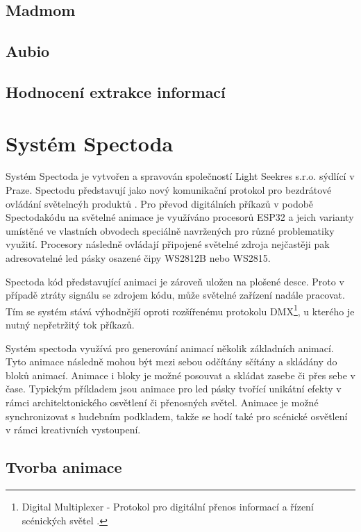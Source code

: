     
\subsection{Madmom}
\subsection{Aubio}
\subsection{Hodnocení extrakce informací} \label{sec:Mir_eval}

\section{Systém Spectoda} \label{sec:Spectoda}

Systém Spectoda je vytvořen a spravován společností Light Seekres s.r.o. sýdlící v Praze. Spectodu představují jako nový komunikační protokol pro bezdrátové ovládání světelncýh produktů \cite{Spectoda}. Pro převod digitálních příkazů v podobě Spectodakódu na světelné animace je využíváno procesorů ESP32 a jeich varianty umístěné ve vlastních obvodech speciálně navržených pro různé problematiky využití. Procesory následně ovládají připojené světelné zdroja nejčastěji pak adresovatelné led pásky osazené čipy WS2812B nebo WS2815.

Spectoda kód představující animaci je zároveň uložen na plošené desce. Proto v případě ztráty signálu se zdrojem kódu, může světelné zařízení nadále pracovat. Tím se systém stává výhodnější oproti rozšířenému protokolu DMX\footnote{Digital Multiplexer - Protokol pro digitální přenos informací a řízení scénických světel \cite{DMX}.}, u kterého je nutný nepřetržitý tok příkazů. 

Systém spectoda využívá pro generování animací několik základních animací. Tyto animace následně mohou být mezi sebou odčítány sčítány a skládány do bloků animací. Animace i bloky je možné posouvat a skládat zasebe či přes sebe v čase. Typickým příkladem jsou animace pro led pásky tvořící unikátní efekty v rámci architektonického osvětlení či přenosných světel. Animace je možné synchronizovat s hudebním podkladem, takže se hodí také pro scénické osvětlení v rámci kreativních vystoupení. 

\subsection{Tvorba animace}

